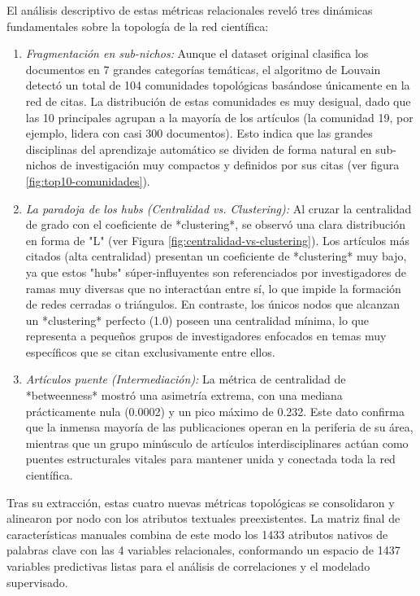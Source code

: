 \documentclass[conference,a4paper]{IEEEtran}
\begin{document}
El análisis descriptivo de estas métricas relacionales reveló tres dinámicas fundamentales sobre la topología de la red científica:
\begin{enumerate}
\item \textit{Fragmentación en sub-nichos:} Aunque el dataset original clasifica los documentos en 7 grandes categorías temáticas, el algoritmo de Louvain detectó un total de 104 comunidades topológicas basándose únicamente en la red de citas. La 
distribución de estas comunidades es muy desigual, dado que las 10 principales agrupan a la mayoría de los artículos (la comunidad 19, por ejemplo, lidera con casi 300 documentos). Esto indica que las grandes disciplinas del aprendizaje automático
se dividen de forma natural en sub-nichos de investigación muy compactos y definidos por sus citas (ver figura \ref{fig:top10-comunidades}).
\item \textit{La paradoja de los hubs (Centralidad vs. Clustering):} Al cruzar la centralidad de grado con el coeficiente de *clustering*, se observó una clara distribución en forma de "L" (ver Figura \ref{fig:centralidad-vs-clustering}). Los artículos más citados (alta centralidad) presentan un 
coeficiente de *clustering* muy bajo, ya que estos "hubs" súper-influyentes son referenciados por investigadores de ramas muy diversas que no interactúan entre sí, lo que impide la formación de redes cerradas o triángulos. En contraste, 
los únicos nodos que alcanzan un *clustering* perfecto (1.0) poseen una centralidad mínima, lo que representa a pequeños grupos de investigadores enfocados en temas muy específicos que se citan exclusivamente entre ellos.
\item \textit{Artículos puente (Intermediación):} La métrica de centralidad de *betweenness* mostró una asimetría extrema, con una mediana prácticamente nula (0.0002) y un pico máximo de 0.232. Este dato confirma que la inmensa mayoría de las publicaciones
operan en la periferia de su área, mientras que un grupo minúsculo de artículos interdisciplinares actúan como puentes estructurales vitales para mantener unida y conectada toda la red científica.
\end{enumerate}

Tras su extracción, estas cuatro nuevas métricas topológicas se consolidaron y alinearon por nodo con los atributos textuales preexistentes. La matriz final de características manuales combina de este modo los 1433 atributos nativos de palabras clave
con las 4 variables relacionales, conformando un espacio de 1437 variables predictivas listas para el análisis de correlaciones y el modelado supervisado.
\end{document}
